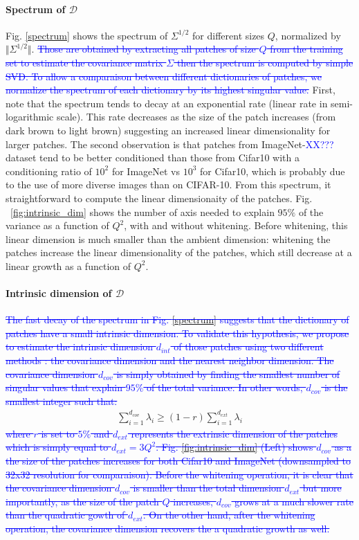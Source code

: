 \documentclass{article}
\newcommand{\Edouard}[1]{\textcolor{blue}{#1}}
\begin{document}
\paragraph{Spectrum of $\mathcal{D}$}
Fig. \ref{spectrum} shows the spectrum of $\Sigma^{1/2}$ for different sizes $Q$, normalized by $\Vert \Sigma^{1/2}\Vert$. \Edouard{\sout{Those are obtained by extracting all patches of size $Q$ from the training set to estimate the  covariance matrix $\Sigma$ then the spectrum is computed by simple SVD. To allow a comparaison between different dictionaries of patches, we normalize the spectrum of each dictionary by its highest singular value.}} First, note that the spectrum tends to decay at an exponential rate (linear rate in semi-logarithmic scale). This rate decreases as the size of the patch increases (from dark brown to light brown) suggesting an increased linear dimensionality for larger patches. The second observation is that patches from ImageNet-\Edouard{XX???} dataset tend to be better conditioned than those from Cifar10 with a conditioning ratio of $10^2$ for ImageNet vs $10^3$ for Cifar10, which is probably due to the use of more diverse images than on CIFAR-10. From this spectrum, it straightforward to compute the linear dimensionaity of the patches. Fig.
~\ref{fig:intrinsic_dim} shows the number of axis needed to explain $95\%$ of the variance as a function of $Q^2$, with and without whitening. Before whitening, this linear dimension is much smaller than the ambient dimension: whitening the patches increase the linear dimensionality of the patches, which still decrease at a linear growth as a function of $Q^2$.

\paragraph{Intrinsic dimension of $\mathcal{D}$}\Edouard{\sout{
The fast decay of the spectrum in Fig. \ref{spectrum} suggests that the dictionary of patches have a small intrinsic dimension. To validate this hypothesis, we propose to estimate the intrinsic dimension $d_{int}$ of those patches using two different methods : the covariance dimension and the nearest neighbor dimension. 
The covariance dimension  $ d_{cov}$ is simply obtained by finding the smallest number of singular values that explain $95\%$ of the total variance. In other words, $d_{cov}$ is the smallest integer such that:}}
\begin{align}
	 \sum_{i=1}^{d_{cov}} \lambda_i \geq (1-r) \sum_{i=1}^{d_{ext}} \lambda_i
\end{align}\Edouard{\sout{
where $r$ is set to $5\%$ and  $d_{ext}$ represents the extrinsic dimension of the patches which is simply equal to $d_{ext} = 3 Q^2$. Fig. \ref{fig:intrinsic_dim} (Left) shows $d_{cov}$ as a the size of the patches increases for both Cifar10 and ImageNet (downsampled to 32x32 resolution for comparaison). Before the whitening operation, it is clear that the covariance dimension $d_{cov}$ is smaller than the total dimension $d_{ext}$ but more importantly, as the size of the patch $Q$  increases, $d_{cov}$ grows at a much slower rate than the quadratic gowth of $d_{ext}$. On the other hand, after the whitening operation, the covariance dimension recovers the a quadratic growth as well.}}
\end{document}
